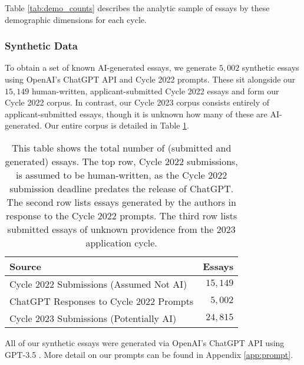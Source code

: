 Table \ref{tab:demo_counts} describes the analytic sample of essays by these demographic dimensions for each cycle. 

\subsubsection{Synthetic Data}\label{sssec:chatgpt}
To obtain a set of known AI-generated essays, we generate $5,002$ synthetic essays using OpenAI's ChatGPT API and Cycle 2022 prompts. These sit alongside our $15,149$ human-written, applicant-submitted Cycle 2022 essays and form our Cycle 2022 corpus. In contrast, our Cycle 2023 corpus consists entirely of applicant-submitted essays, though it is unknown how many of these are AI-generated. Our entire corpus is detailed in Table \ref{tab:cycle_counts}.

\begin{table}[htbp]
  \centering
  \caption{This table shows the total number of (submitted and generated) essays. The top row, Cycle 2022 submissions, is assumed to be human-written, as the Cycle 2022 submission deadline predates the release of ChatGPT. The second row lists essays generated by the authors in response to the Cycle 2022 prompts. The third row lists submitted essays of unknown providence from the 2023 application cycle.}
  \label{tab:cycle_counts}
  \begin{tabular}{ l r }
      \toprule
      Source  & Essays \\
      \midrule
      Cycle 2022 Submissions (Assumed Not AI) & $15,149$ \\
      ChatGPT Responses to Cycle 2022 Prompts & $5,002$ \\
      Cycle 2023 Submissions (Potentially AI) & $24,815$ \\
      \bottomrule
  \end{tabular}
\end{table}

All of our synthetic essays were generated via OpenAI's ChatGPT API using GPT-3.5 \cite{brown_language_2020}. More detail on our prompts can be found in Appendix \ref{app:prompt}.

